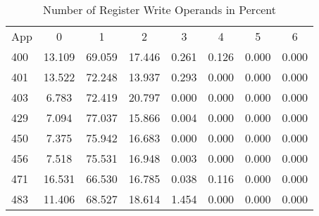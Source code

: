 \begin{Solution}
\begin{table}[H]
    \centering
    \caption{Number of Register Write Operands in Percent}
    \label{tab:pD:num_rw_operands}
    \begin{tabular}{| l | c | c | c | c | c | c | c |}
        \hline
        \multirow{2}{*}{App} & \multirow{2}{*}{0} & \multirow{2}{*}{1} & \multirow{2}{*}{2} & \multirow{2}{*}{3} & \multirow{2}{*}{4} & \multirow{2}{*}{5} & \multirow{2}{*}{6} \\
        & & & & & & & \\
        \hline
        400 & 13.109 & 69.059 & 17.446 & 0.261 & 0.126 & 0.000 & 0.000 \\
        \hline
        401 & 13.522 & 72.248 & 13.937 & 0.293 & 0.000 & 0.000 & 0.000 \\
        \hline
        403 & 6.783 & 72.419 & 20.797 & 0.000 & 0.000 & 0.000 & 0.000 \\
        \hline
        429 & 7.094 & 77.037 & 15.866 & 0.004 & 0.000 & 0.000 & 0.000 \\
        \hline
        450 & 7.375 & 75.942 & 16.683 & 0.000 & 0.000 & 0.000 & 0.000 \\
        \hline
        456 & 7.518 & 75.531 & 16.948 & 0.003 & 0.000 & 0.000 & 0.000 \\
        \hline
        471 & 16.531 & 66.530 & 16.785 & 0.038 & 0.116 & 0.000 & 0.000 \\
        \hline
        483 & 11.406 & 68.527 & 18.614 & 1.454 & 0.000 & 0.000 & 0.000 \\
        \hline
    \end{tabular}
\end{table}


\end{Solution}
